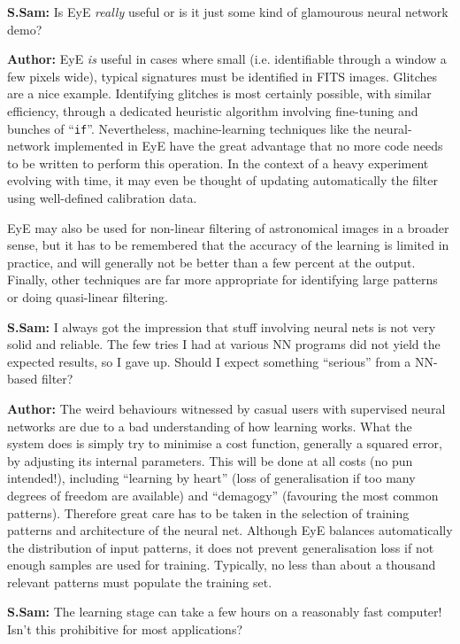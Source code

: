 \documentclass[11pt,titlepage]{article}
\begin{document}
{\bf S.Sam:} Is {\sc EyE} {\em really} useful or is it just some kind of glamourous neural network demo?

{\bf Author:} {\sc EyE} {\em is} useful in cases where small (i.e. identifiable through a window a few pixels wide),
typical signatures must be identified in FITS images. Glitches are a nice example. Identifying glitches is most
certainly possible, with similar efficiency, through a dedicated heuristic algorithm involving fine-tuning and bunches
of ``{\tt if}''. Nevertheless, machine-learning techniques like the neural-network implemented in {\sc EyE} have the great
advantage that no more code needs to be written to perform this operation. In the context of a heavy experiment evolving
with time, it may even be thought of updating automatically the filter using well-defined calibration data.

{\sc EyE} may also be used for non-linear filtering of astronomical images in a broader sense, but it has to be remembered that
the accuracy of the learning is limited in practice, and will generally not be better than a few percent at the output.
Finally, other techniques are far more appropriate for identifying large patterns or doing quasi-linear filtering.

{\bf S.Sam:} I always got the impression that stuff involving neural nets is not very solid and reliable. The
few tries I had at various NN programs did not yield the expected results, so I gave up. Should I expect something
``serious'' from a NN-based filter?

{\bf Author:} The weird behaviours witnessed by casual users with supervised neural networks are due to a bad
understanding of how learning works. What the system does is simply try to minimise a cost function, generally a
squared error, by adjusting its internal parameters. This will be done at all costs (no pun intended!), including
``learning by heart'' (loss of generalisation if too many degrees of freedom are available) and ``demagogy'' (favouring
the most common patterns). Therefore great care has to be taken in the selection of training patterns and architecture
of the neural net. Although {\sc EyE} balances automatically the distribution of input patterns, it does not prevent
generalisation loss if not enough samples are used for training. Typically, no less than about a thousand relevant
patterns must populate the training set.

{\bf S.Sam:} The learning stage can take a few hours on a reasonably fast computer! Isn't this prohibitive for most
applications?
\end{document}
